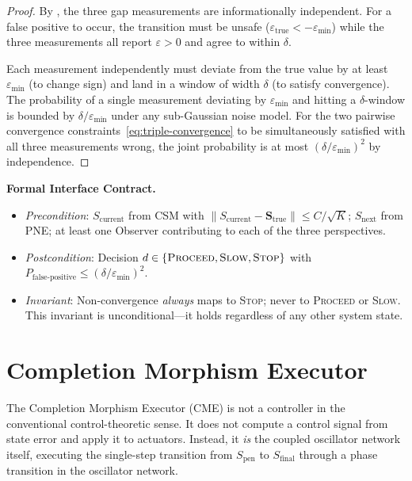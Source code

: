 \documentclass[twocolumn,10pt]{article}
\theoremstyle{definition}
\newcommand{\Sentropy}{\mathbf{S}}
\newcommand{\Scurrent}{S_{\mathrm{current}}}
\newcommand{\Snext}{S_{\mathrm{next}}}
\newcommand{\Sfinal}{S_{\mathrm{final}}}
\newcommand{\Spen}{S_{\mathrm{pen}}}
\begin{document}
\begin{proof}
By , the three gap measurements are informationally independent. For a false positive to occur, the transition must be unsafe ($\varepsilon_{\mathrm{true}} < -\varepsilon_{\min}$) while the three measurements all report $\varepsilon > 0$ and agree to within $\delta$.

Each measurement independently must deviate from the true value by at least $\varepsilon_{\min}$ (to change sign) and land in a window of width $\delta$ (to satisfy convergence). The probability of a single measurement deviating by $\varepsilon_{\min}$ and hitting a $\delta$-window is bounded by $\delta/\varepsilon_{\min}$ under any sub-Gaussian noise model. For the two pairwise convergence constraints~\eqref{eq:triple-convergence} to be simultaneously satisfied with all three measurements wrong, the joint probability is at most $(\delta/\varepsilon_{\min})^2$ by independence.
\end{proof}

\textbf{Formal Interface Contract.}
\begin{itemize}[leftmargin=*]
\item \emph{Precondition}: $\Scurrent$ from CSM with $\|\Scurrent - \Sentropy_{\mathrm{true}}\| \leq C/\sqrt{K}$; $\Snext$ from PNE; at least one Observer contributing to each of the three perspectives.
\item \emph{Postcondition}: Decision $d \in \{\textsc{Proceed}, \textsc{Slow}, \textsc{Stop}\}$ with $P_{\mathrm{false\text{-}positive}} \leq (\delta/\varepsilon_{\min})^2$.
\item \emph{Invariant}: Non-convergence \emph{always} maps to \textsc{Stop}; never to \textsc{Proceed} or \textsc{Slow}. This invariant is unconditional---it holds regardless of any other system state.
\end{itemize}


\section{Completion Morphism Executor}
\label{sec:cme}

The Completion Morphism Executor (CME) is not a controller in the conventional control-theoretic sense. It does not compute a control signal from state error and apply it to actuators. Instead, it \emph{is} the coupled oscillator network itself, executing the single-step transition from $\Spen$ to $\Sfinal$ through a phase transition in the oscillator network.
\end{document}
